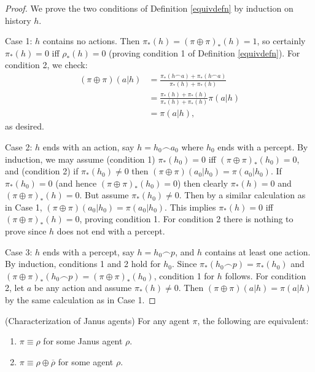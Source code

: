 \documentclass[runningheads]{llncs}
\begin{document}
\begin{proof}
    We prove the two conditions of Definition \ref{equivdefn} by
    induction on history $h$.
 
    Case 1: $h$ contains no actions. Then $\pi_*(h)=(\pi\oplus\pi)_*(h)=1$, so
    certainly $\pi_*(h)=0$ iff $\rho_*(h)=0$ (proving condition 1 of
    Definition \ref{equivdefn}).
    For condition 2, we check:
    \begin{align*}
        (\pi\oplus\pi)(a|h)
            &= \frac{\pi_*(h\frown a) + \pi_*(h\frown a)}{\pi_*(h)+\pi_*(h)}\\
            &= \frac{\pi_*(h)+\pi_*(h)}{\pi_*(h)+\pi_*(h)}\pi(a|h)\\
            &= \pi(a|h),
    \end{align*}
    as desired.

    Case 2: $h$ ends with an action, say $h=h_0\frown a_0$ where $h_0$ ends with
        a percept.
        By induction, we may assume (condition 1)
        $\pi_*(h_0)=0$ iff $(\pi\oplus\pi)_*(h_0)=0$,
        and (condition 2) if $\pi_*(h_0)\not=0$ then
        $(\pi\oplus\pi)(a_0|h_0)=\pi(a_0|h_0)$.
        If $\pi_*(h_0)=0$ (and hence $(\pi\oplus\pi)_*(h_0)=0$) then clearly
        $\pi_*(h)=0$ and $(\pi\oplus\pi)_*(h)=0$. But assume $\pi_*(h_0)\not=0$.
        Then by a similar calculation as in Case 1,
        $(\pi\oplus\pi)(a_0|h_0)=\pi(a_0|h_0)$.
        This implies $\pi_*(h)=0$ iff $(\pi\oplus\pi)_*(h)=0$, proving condition 1.
        For condition 2 there is nothing to prove since $h$ does not end with a percept.

    Case 3: $h$ ends with a percept, say $h=h_0\frown p$, and $h$ contains at least one action.
        By induction, conditions 1 and 2 hold for $h_0$.
        Since $\pi_*(h_0\frown p)=\pi_*(h_0)$ and
        $(\pi\oplus\pi)_*(h_0\frown p)=(\pi\oplus\pi)_*(h_0)$,
        condition 1 for $h$ follows.
        For condition 2, let $a$ be any action and assume
        $\pi_*(h)\not=0$. Then $(\pi\oplus\pi)(a|h)=\pi(a|h)$ by the
        same calculation as in Case 1.
\end{proof}

\begin{proposition}
    (Characterization of Janus agents)
    For any agent $\pi$, the following are equivalent:
    \begin{enumerate}
        \item $\pi\equiv\rho$ for some Janus agent $\rho$.
        \item $\pi\equiv\rho\oplus\overline{\rho}$ for some agent $\rho$.
    \end{enumerate}
\end{proposition}
\end{document}
